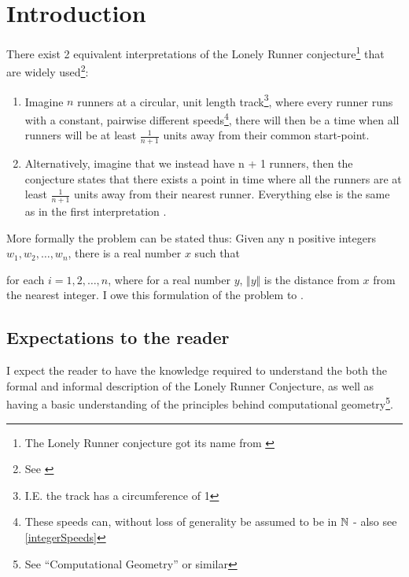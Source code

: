 \section{Introduction}
\label{introduction}

There exist 2 equivalent interpretations of the Lonely Runner conjecture\footnote{The Lonely Runner conjecture got its name from \cite{Bienia97flows.view-obstructions7}} that are widely used\footnote{See \cite{ANote}}:
\begin{enumerate}
\item Imagine $n$ runners at a circular, unit length track\footnote{I.E. the track has a circumference of 1}, where every runner runs with a constant, pairwise different speeds\footnote{These speeds can, without loss of generality be assumed to be in $\mathbb{N}$ \cite{Bienia97flows.view-obstructions} - also see \ref{integerSpeeds}}, there will then be a time when all runners will be at least $\frac{1}{n + 1}$ units away from their common start-point.\\

\item Alternatively, imagine that we instead have n + 1 runners, then the conjecture states that there exists a point in time where all the runners are at least $\frac{1}{n + 1}$ units away from their nearest runner. Everything else is the same as in the first interpretation \cite{Bienia97flows.view-obstructions}.\\
\end{enumerate}

More formally the problem can be stated thus: 
Given any n positive integers $w_1, w_2, \ldots, w_n$, there is a real number $x$ such that 

for each $i = 1, 2, \ldots, n$, where for a real number $y$, $\Vert y \Vert$ is the distance from $x$ from the nearest integer. I owe this formulation of the problem to \cite{ANote}.

\subsection{Expectations to the reader}
\label{expectations}
I expect the reader to have the knowledge required to understand the
both the formal and informal description of the Lonely Runner
Conjecture, as well as having a basic understanding of the principles
behind computational geometry\footnote{See ``Computational
  Geometry'' \cite{citeulike:3347056} or similar}.

